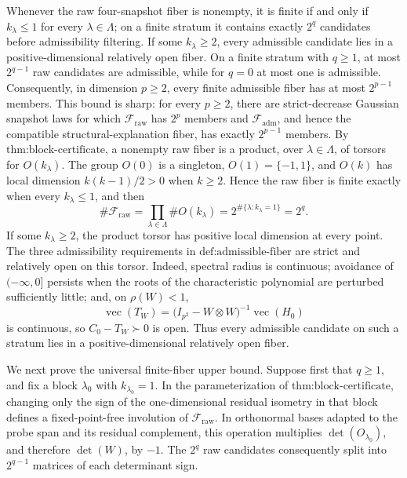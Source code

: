Whenever the raw four-snapshot fiber is nonempty, it is finite if and only if \(k_\lambda\leq 1\) for every \(\lambda\in\Lambda\); on a finite stratum it contains exactly \(2^q\) candidates before admissibility filtering.  If some \(k_\lambda\geq 2\), every admissible candidate lies in a positive-dimensional relatively open fiber.  On a finite stratum with \(q\geq1\), at most \(2^{q-1}\) raw candidates are admissible, while for \(q=0\) at most one is admissible.  Consequently, in dimension \(p\geq2\), every finite admissible fiber has at most \(2^{p-1}\) members.  This bound is sharp: for every \(p\geq2\), there are strict-decrease Gaussian snapshot laws for which \(\mathcal F_{\mathrm{raw}}\) has \(2^p\) members and \(\mathcal F_{\mathrm{adm}}\), and hence the compatible structural-explanation fiber, has exactly \(2^{p-1}\) members.
By \(\text{thm:block-certificate}\), a nonempty raw fiber is a product, over \(\lambda\in\Lambda\), of torsors for \(O(k_\lambda)\).  The group \(O(0)\) is a singleton, \(O(1)=\{-1,1\}\), and \(O(k)\) has local dimension \(k(k-1)/2>0\) when \(k\geq2\).  Hence the raw fiber is finite exactly when every \(k_\lambda\leq1\), and then
\[
 \#\mathcal F_{\mathrm{raw}}
 =\prod_{\lambda\in\Lambda}\#O(k_\lambda)
 =2^{\#\{\lambda:k_\lambda=1\}}=2^q.
\]
If some \(k_\lambda\geq2\), the product torsor has positive local dimension at every point.  The three admissibility requirements in \(\text{def:admissible-fiber}\) are strict and relatively open on this torsor.  Indeed, spectral radius is continuous; avoidance of \(( -\infty,0]\) persists when the roots of the characteristic polynomial are perturbed sufficiently little; and, on \(\rho(W)<1\),
\[
 \operatorname{vec}(T_W)
 =\bigl(I_{p^2}-W\otimes W\bigr)^{-1}\operatorname{vec}(H_0)
\]
is continuous, so \(C_0-T_W\succ0\) is open.  Thus every admissible candidate on such a stratum lies in a positive-dimensional relatively open fiber.

We next prove the universal finite-fiber upper bound.  Suppose first that \(q\geq1\), and fix a block \(\lambda_0\) with \(k_{\lambda_0}=1\).  In the parameterization of \(\text{thm:block-certificate}\), changing only the sign of the one-dimensional residual isometry in that block defines a fixed-point-free involution of \(\mathcal F_{\mathrm{raw}}\).  In orthonormal bases adapted to the probe span and its residual complement, this operation multiplies \(\det(O_{\lambda_0})\), and therefore \(\det(W)\), by \(-1\).  The \(2^q\) raw candidates consequently split into \(2^{q-1}\) matrices of each determinant sign.

